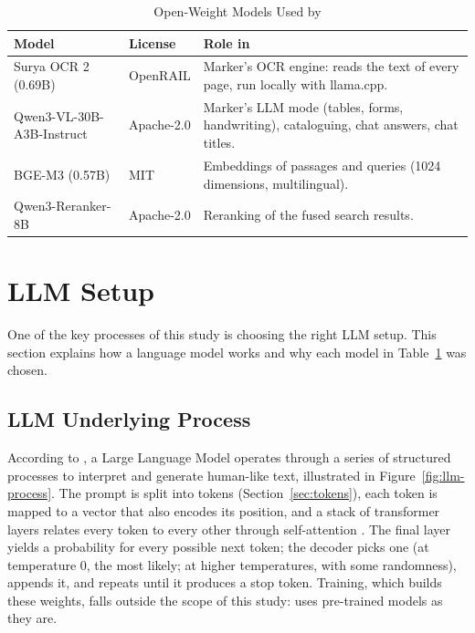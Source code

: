 \begin{table}[htbp]
  \centering
  \caption{Open-Weight Models Used by \cs{}}\label{tab:models}
  \small
  \begin{tabularx}{\linewidth}{@{}>{\raggedright\arraybackslash}p{3.6cm}>{\raggedright\arraybackslash}p{2.0cm}X@{}}
    \toprule
    \textbf{Model} & \textbf{License} & \textbf{Role in \cs{}} \\
    \midrule
    Surya OCR 2 (0.69B) & OpenRAIL & Marker's OCR engine: reads the text of every page, run locally with llama.cpp. \\
    Qwen3-VL-30B-A3B-Instruct & Apache-2.0 & Marker's LLM mode (tables, forms, handwriting), cataloguing, chat answers, chat titles. \\
    BGE-M3 (0.57B) & MIT & Embeddings of passages and queries (1024 dimensions, multilingual). \\
    Qwen3-Reranker-8B & Apache-2.0 & Reranking of the fused search results. \\
    \bottomrule
  \end{tabularx}
\end{table}

\section{LLM Setup}\label{sec:llm-setup}

One of the key processes of this study is choosing the right LLM setup. This section explains how a language model works and why each model in Table~\ref{tab:models} was chosen.

\subsection{LLM Underlying Process}

According to \citet{mulugeta2023}, a Large Language Model operates through a series of structured processes to interpret and generate human-like text, illustrated in Figure~\ref{fig:llm-process}. The prompt is split into tokens (Section~\ref{sec:tokens}), each token is mapped to a vector that also encodes its position, and a stack of transformer layers relates every token to every other through self-attention \citep{vaswani2017}. The final layer yields a probability for every possible next token; the decoder picks one (at temperature 0, the most likely; at higher temperatures, with some randomness), appends it, and repeats until it produces a stop token. Training, which builds these weights, falls outside the scope of this study: \cs{} uses pre-trained models as they are.

